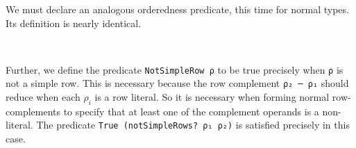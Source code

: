 \documentclass[authoryear, acmsmall, screen, review, nonacm]{acmart}
\begin{document}
We must declare an analogous orderedness predicate, this time for normal types. Its definition is nearly identical.

\begin{code}%
\>[0]\AgdaSpace{}%
\AgdaSymbol{:}\AgdaSpace{}%
\AgdaSpace{}%
\AgdaSpace{}%
\AgdaSpace{}%
\AgdaOperator{\AgdaInductiveConstructor{R[}}\AgdaSpace{}%
\AgdaSpace{}%
\AgdaOperator{\AgdaInductiveConstructor{]}}\AgdaSpace{}%
\AgdaSpace{}%
\<%
\\
\>[0]\AgdaSpace{}%
\AgdaSymbol{:}\AgdaSpace{}%
\AgdaSpace{}%
\AgdaSymbol{(}\AgdaSpace{}%
\AgdaSymbol{:}\AgdaSpace{}%
\AgdaSpace{}%
\AgdaSpace{}%
\AgdaSpace{}%
\AgdaOperator{\AgdaInductiveConstructor{R[}}\AgdaSpace{}%
\AgdaSpace{}%
\AgdaOperator{\AgdaInductiveConstructor{]}}\AgdaSymbol{)}\AgdaSpace{}%
\AgdaSpace{}%
\AgdaSpace{}%
\AgdaSymbol{(}\AgdaSpace{}%
\AgdaSymbol{)}\<%
\end{code}

Further, we define the predicate \verb!NotSimpleRow ρ! to be true precisely when \verb!ρ! is not a simple row. This is necessary because the row complement \verb!ρ₂ ─ ρ₁! should reduce when each $\rho_i$ is a row literal. So it is necessary when forming normal row-complements to specify that at least one of the complement operands is a non-literal. The predicate \verb!True (notSimpleRows? ρ₁ ρ₂)! is satisfied precisely in this case.

\begin{code}%
\>[0]\AgdaSpace{}%
\AgdaSymbol{:}\AgdaSpace{}%
\AgdaSpace{}%
\AgdaSpace{}%
\AgdaOperator{\AgdaInductiveConstructor{R[}}\AgdaSpace{}%
\AgdaSpace{}%
\AgdaOperator{\AgdaInductiveConstructor{]}}\AgdaSpace{}%
\AgdaSpace{}%
\<%
\\
\>[0]\AgdaSpace{}%
\AgdaSymbol{:}%
\>[2742I]\AgdaSpace{}%
\AgdaSymbol{(}\AgdaSpace{}%
\AgdaSpace{}%
\AgdaSymbol{:}\AgdaSpace{}%
\AgdaSpace{}%
\AgdaSpace{}%
\AgdaOperator{\AgdaInductiveConstructor{R[}}\AgdaSpace{}%
\AgdaSpace{}%
\AgdaOperator{\AgdaInductiveConstructor{]}}\AgdaSymbol{)}\AgdaSpace{}%
\<%
\\
\>[.][@{}l@{}]\<[2742I]%
\>[17]\AgdaSpace{}%
\AgdaSymbol{(}\AgdaSpace{}%
\AgdaSpace{}%
\AgdaSpace{}%
\AgdaSpace{}%
\AgdaSymbol{)}\<%
\end{code}
\end{document}

